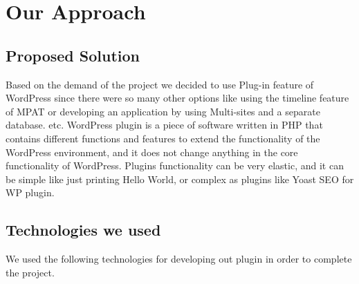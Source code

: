 \section{\textbf{Our Approach}}\label{sec:main}
\subsection{ Proposed Solution}

Based on the demand of the project we decided to use
Plug-in feature of WordPress since there were so many other
options like using the timeline feature of MPAT or developing
an application by using Multi-sites and a separate database.
etc. WordPress plugin is a piece of software written in PHP
that contains different functions and features to extend the
functionality of the WordPress environment, and it does not
change anything in the core functionality of WordPress. Plugins
functionality can be very elastic, and it can be simple like
just printing Hello World, or complex as plugins like Yoast
SEO for WP plugin.

\subsection{Technologies we used}
 We used the following technologies for developing out plugin
in order to complete the project.


